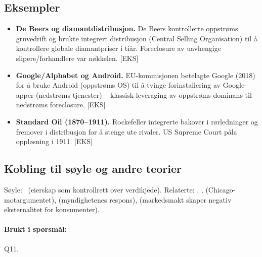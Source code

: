 \subsection*{Eksempler}
\begin{itemize}\setlength{\itemsep}{2pt}
\item \textbf{De Beers og diamantdistribusjon.} De Beers kontrollerte oppstrøms gruvedrift og brukte integrert distribusjon (Central Selling Organisation) til å kontrollere globale diamantpriser i tiår. Foreclosure av uavhengige slipere/forhandlere var nøkkelen. [EKS]
\item \textbf{Google/Alphabet og Android.} EU-kommisjonen bøtelagte Google (2018) for å bruke Android (oppstrøms OS) til å tvinge forinstallering av Google-apper (nedstrøms tjenester) -- klassisk leveraging av oppstrøms dominans til nedstrøms foreclosure. [EKS]
\item \textbf{Standard Oil (1870--1911).} Rockefeller integrerte bakover i rørledninger og fremover i distribusjon for å stenge ute rivaler. US Supreme Court påla oppløsning i 1911. [EKS]
\end{itemize}

\subsection*{Kobling til søyle og andre teorier}
Søyle: \SOne\ (eierskap som kontrollrett over verdikjede). Relaterte: , ,  (Chicago-motargumentet),  (myndighetenes respons),  (markedsmakt skaper negativ eksternalitet for konsumenter).

\paragraph{Brukt i spørsmål:} Q11.
